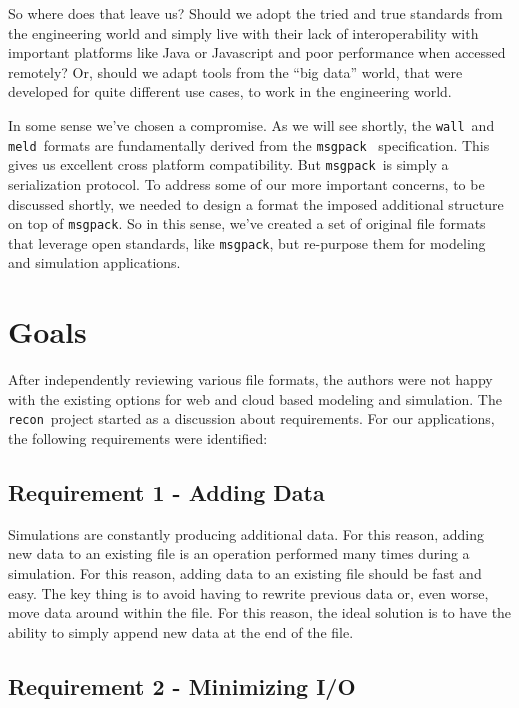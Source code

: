 \documentclass[11pt,a4paper,twocolumn]{article}
\newcommand{\recon}{\texttt{recon}}
\newcommand{\wall}{\texttt{wall}}
\newcommand{\meld}{\texttt{meld}}
\newcommand{\msgpack}{\texttt{msgpack}}
\begin{document}
So where does that leave us?  Should we adopt the tried and true
standards from the engineering world and simply live with their lack
of interoperability with important platforms like Java or Javascript
and poor performance when accessed remotely?  Or, should we adapt
tools from the ``big data'' world, that were developed for quite
different use cases, to work in the engineering world.

In some sense we've chosen a compromise.  As we will see shortly, the
\wall\ and \meld\ formats are fundamentally derived from the
\msgpack\ \cite{msgpack} specification.  This gives us excellent cross
platform compatibility.  But \msgpack\ is simply a serialization
protocol.  To address some of our more important concerns, to be
discussed shortly, we needed to design a format the imposed additional
structure on top of \msgpack. So in this sense, we've created a set of
original file formats that leverage open standards, like \msgpack, but
re-purpose them for modeling and simulation applications.

\section{Goals}
\label{sec:goals}

After independently reviewing various file formats, the authors were
not happy with the existing options for web and cloud based modeling
and simulation.  The \recon\ project started as a discussion about
requirements.  For our applications, the following requirements were
identified:

\subsection{Requirement 1 - Adding Data}


Simulations are constantly producing additional data.  For this
reason, adding new data to an existing file is an operation performed
many times during a simulation.  For this reason, adding data to an
existing file should be fast and easy.  The key thing is to avoid having to
rewrite previous data or, even worse, move data around within the
file.  For this reason, the ideal solution is to have the ability to
simply append new data at the end of the file.

\subsection{Requirement 2 - Minimizing I/O}
\end{document}
